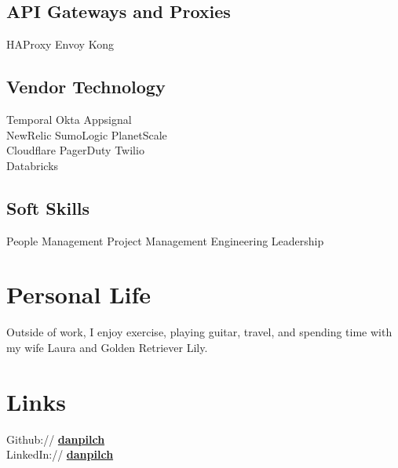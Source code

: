 \documentclass[]{danpilch-resume}
\begin{document}
\begin{minipage}[t]{0.33\textwidth}
\subsection{API Gateways and Proxies}
HAProxy \textbullet{} Envoy \textbullet{} Kong \\
\sectionsep

\subsection{Vendor Technology}
Temporal \textbullet{} Okta \textbullet{} Appsignal \\
NewRelic \textbullet{} SumoLogic \textbullet{} PlanetScale \\
Cloudflare \textbullet{} PagerDuty \textbullet{} Twilio \\
Databricks
\sectionsep

\subsection{Soft Skills}
People Management \textbullet{} Project Management \textbullet{} Engineering Leadership \\
\sectionsep


\section{Personal Life}
Outside of work, I enjoy exercise, playing guitar, travel, and spending time with my wife Laura and Golden Retriever Lily.
\sectionsep


\section{Links}
Github:// \href{https://github.com/danpilch}{\bf danpilch} \\
LinkedIn://  \href{https://www.linkedin.com/in/danpilch}{\bf danpilch}
\sectionsep

\end{minipage}
\end{document}
